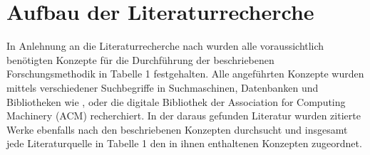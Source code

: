 \section{Aufbau der Literaturrecherche}

In Anlehnung an die Literaturrecherche nach \cite[]{10.5555/2017160.2017162} wurden alle voraussichtlich benötigten Konzepte für die Durchführung der beschriebenen Forschungsmethodik in Tabelle 1 festgehalten.
Alle angeführten Konzepte wurden mittels verschiedener Suchbegriffe in Suchmaschinen, Datenbanken und Bibliotheken wie \cite[]{.2282023}, \cite[]{.2282023b} oder die digitale Bibliothek der Association for Computing Machinery (ACM) \cite[]{ACMDigitalLibrary.2282023}  recherchiert.
In der daraus gefunden Literatur wurden zitierte Werke ebenfalls nach den beschriebenen Konzepten durchsucht und insgesamt jede Literaturquelle in Tabelle 1 den in ihnen enthaltenen Konzepten zugeordnet.  
